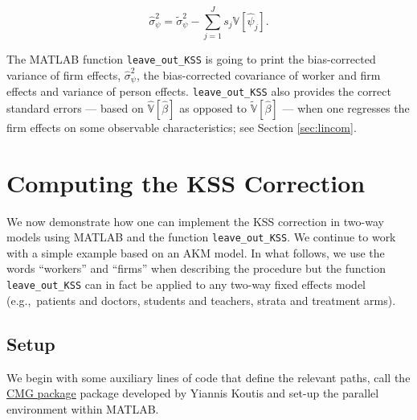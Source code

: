 \documentclass[11pt]{article}
\begin{document}
\begin{equation}
\hat{\sigma}^{2}_{\psi}=\tilde{\sigma}^{2}_{\psi}-\sum_{j=1}^{J}s_{j}{\mathbb{V}[\hat{\psi}_{j}]}.
\end{equation}

The MATLAB function \texttt{leave\_out\_KSS} is going to print the bias-corrected variance of firm effects, \(\hat{\sigma}^{2}_{\psi}\), the bias-corrected covariance of worker and firm effects and variance
of person effects.  \texttt{leave\_out\_KSS} also provides the correct standard errors --- based on \(\hat{\mathbb{V}}[\hat{\beta}]\)  as opposed to \(\tilde{\mathbb{V}}[\hat{\beta}]\) --- when one regresses the firm effects on some observable characteristics; see Section \ref{sec:lincom}.
\hypertarget{computing-the-kss-correction}{%
\section{Computing the KSS
Correction}\label{computing-the-kss-correction}}

We now demonstrate how one can implement the KSS correction in two-way
models using MATLAB and the function \texttt{leave\_out\_KSS}. We
continue to work with a simple example based on an AKM model. In what
follows, we use the words ``workers'' and ``firms'' when describing the
procedure but the function \texttt{leave\_out\_KSS}
can in fact be applied to any two-way fixed effects model (e.g.,~patients and doctors,
students and teachers, strata and treatment arms).

\hypertarget{setup}{%
\subsection{Setup}\label{setup}}

We begin with some auxiliary lines of code that define the relevant
paths, call the \href{http://www.cs.cmu.edu/jkoutis/cmg.html}{CMG package} package developed by Yiannis Koutis and set-up the
parallel environment within MATLAB.
\end{document}
